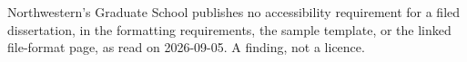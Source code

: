 %


%
	{Northwestern's Graduate School publishes no accessibility requirement for a
	 filed dissertation, in the formatting requirements, the sample template, or
	 the linked file-format page, as read on 2026-09-05. A finding, not a
	 licence.}

